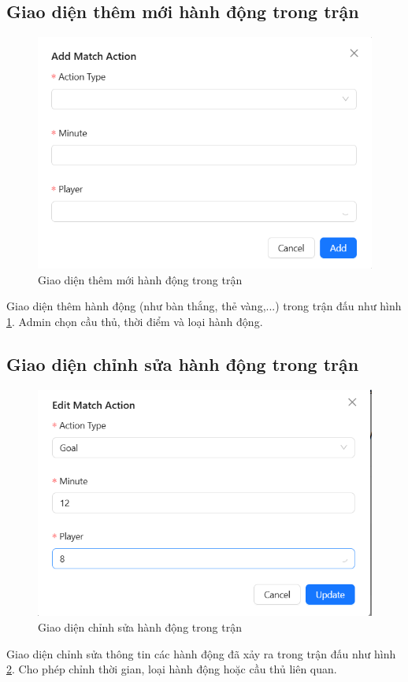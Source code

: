\documentclass[../BTL.tex]{subfiles}
\begin{document}
\subsection{Giao diện thêm mới hành động trong trận}
\begin{figure}
    \centering
    \includegraphics[width=1\linewidth]{Hinhve/admin_add_match_action.png}
    \caption{Giao diện thêm mới hành động trong trận}
    \label{fig:admin_add_match_action}
\end{figure}
Giao diện thêm hành động (như bàn thắng, thẻ vàng,...) trong trận đấu như hình \ref{fig:admin_add_match_action}. Admin chọn cầu thủ, thời điểm và loại hành động.

\subsection{Giao diện chỉnh sửa hành động trong trận}
\begin{figure}
    \centering
    \includegraphics[width=1\linewidth]{Hinhve/admin_edit_match_action.png}
    \caption{Giao diện chỉnh sửa hành động trong trận}
    \label{fig:admin_edit_match_action}
\end{figure}
Giao diện chỉnh sửa thông tin các hành động đã xảy ra trong trận đấu như hình \ref{fig:admin_edit_match_action}. Cho phép chỉnh thời gian, loại hành động hoặc cầu thủ liên quan.
\end{document}
